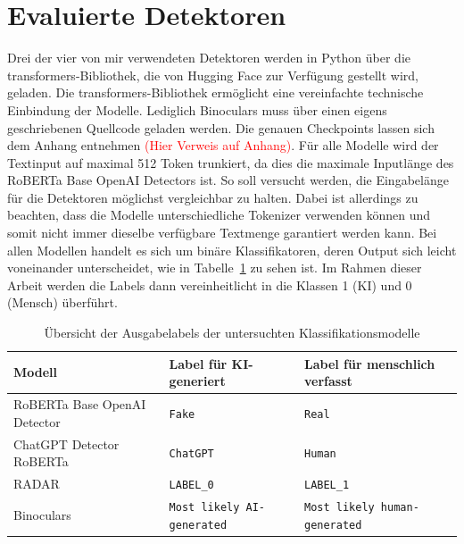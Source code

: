 \section{Evaluierte Detektoren}
Drei der vier von mir verwendeten Detektoren werden in Python über die transformers-Bibliothek, die von Hugging Face zur Verfügung gestellt wird, geladen. Die transformers-Bibliothek ermöglicht eine vereinfachte technische Einbindung der Modelle. Lediglich Binoculars muss über einen eigens geschriebenen Quellcode geladen werden. Die genauen Checkpoints lassen sich dem Anhang entnehmen \textcolor{red}{(Hier Verweis auf Anhang)}. Für alle Modelle wird der Textinput auf maximal 512 Token trunkiert, da dies die maximale Inputlänge des RoBERTa Base OpenAI Detectors ist. So soll versucht werden, die Eingabelänge für die Detektoren möglichst vergleichbar zu halten. Dabei ist allerdings zu beachten, dass die Modelle unterschiedliche Tokenizer verwenden können und somit nicht immer dieselbe verfügbare Textmenge garantiert werden kann. Bei allen Modellen handelt es sich um binäre Klassifikatoren, deren Output sich leicht voneinander unterscheidet, wie in Tabelle~\ref{table:ki_labels} zu sehen ist. Im Rahmen dieser Arbeit werden die Labels dann vereinheitlicht in die Klassen 1 (KI) und 0 (Mensch) überführt.

\begin{table}[htbp]
  \centering
  \caption{Übersicht der Ausgabelabels der untersuchten Klassifikationsmodelle}
  \label{table:ki_labels}
  \begin{tabularx}{1.0\textwidth}{>{\raggedright\arraybackslash}X>{\raggedright\arraybackslash}X>{\raggedright\arraybackslash}X}
    \toprule
    \textbf{Modell}              & \textbf{Label für KI-generiert}   & \textbf{Label für menschlich verfasst} \\
    \midrule
    RoBERTa Base OpenAI Detector & \texttt{Fake}                     & \texttt{Real}                          \\
    ChatGPT Detector RoBERTa     & \texttt{ChatGPT}                  & \texttt{Human}                         \\
    RADAR                        & \texttt{LABEL\_0}                 & \texttt{LABEL\_1}                      \\
    Binoculars                   & \texttt{Most likely AI-generated} & \texttt{Most likely human-generated}   \\
    \bottomrule
  \end{tabularx}
\end{table}

